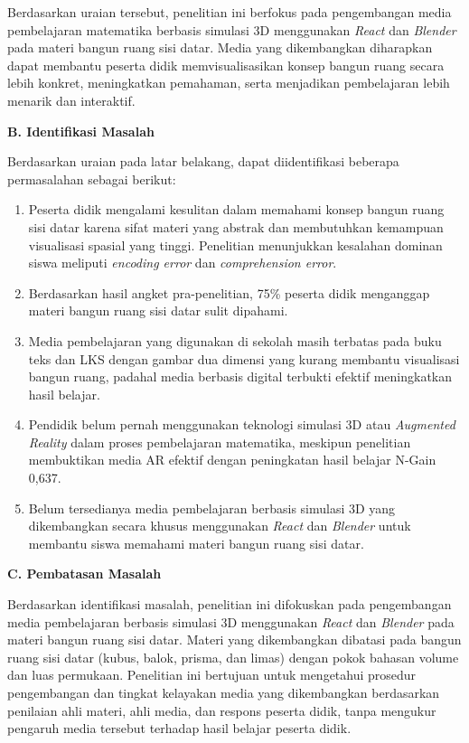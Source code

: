 \hspace*{1cm}Berdasarkan uraian tersebut, penelitian ini berfokus pada pengembangan media pembelajaran matematika berbasis simulasi 3D menggunakan \textit{React} dan \textit{Blender} pada materi bangun ruang sisi datar. Media yang dikembangkan diharapkan dapat membantu peserta didik memvisualisasikan konsep bangun ruang secara lebih konkret, meningkatkan pemahaman, serta menjadikan pembelajaran lebih menarik dan interaktif.

\vspace{0.5cm}

\textbf{B. Identifikasi Masalah}

\hspace*{1cm}Berdasarkan uraian pada latar belakang, dapat diidentifikasi beberapa permasalahan sebagai berikut:
\begin{enumerate}
    \item Peserta didik mengalami kesulitan dalam memahami konsep bangun ruang sisi datar karena sifat materi yang abstrak dan membutuhkan kemampuan visualisasi spasial yang tinggi. Penelitian menunjukkan kesalahan dominan siswa meliputi \textit{encoding error} dan \textit{comprehension error}.
    \item Berdasarkan hasil angket pra-penelitian, 75\% peserta didik menganggap materi bangun ruang sisi datar sulit dipahami.
    \item Media pembelajaran yang digunakan di sekolah masih terbatas pada buku teks dan LKS dengan gambar dua dimensi yang kurang membantu visualisasi bangun ruang, padahal media berbasis digital terbukti efektif meningkatkan hasil belajar.
    \item Pendidik belum pernah menggunakan teknologi simulasi 3D atau \textit{Augmented Reality} dalam proses pembelajaran matematika, meskipun penelitian membuktikan media AR efektif dengan peningkatan hasil belajar N-Gain 0,637.
    \item Belum tersedianya media pembelajaran berbasis simulasi 3D yang dikembangkan secara khusus menggunakan \textit{React} dan \textit{Blender} untuk membantu siswa memahami materi bangun ruang sisi datar.
\end{enumerate}

\textbf{C. Pembatasan Masalah}

\hspace*{1cm}Berdasarkan identifikasi masalah, penelitian ini difokuskan pada pengembangan media pembelajaran berbasis simulasi 3D menggunakan \textit{React} dan \textit{Blender} pada materi bangun ruang sisi datar. Materi yang dikembangkan dibatasi pada bangun ruang sisi datar (kubus, balok, prisma, dan limas) dengan pokok bahasan volume dan luas permukaan. Penelitian ini bertujuan untuk mengetahui prosedur pengembangan dan tingkat kelayakan media yang dikembangkan berdasarkan penilaian ahli materi, ahli media, dan respons peserta didik, tanpa mengukur pengaruh media tersebut terhadap hasil belajar peserta didik.\\

